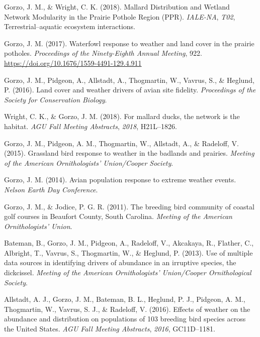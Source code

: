 \documentclass[11pt,a4paper,]{awesome-cv}
\newlength{\cslhangindent}
\newenvironment{CSLReferences}[2] %
 {\begin{list}{}{%
  \setlength{\itemindent}{0pt}
  \setlength{\leftmargin}{0pt}
  \setlength{\parsep}{0pt}
  \ifodd #1
   \setlength{\leftmargin}{\cslhangindent}
   \setlength{\itemindent}{-1\cslhangindent}
  \fi
  \setlength{\itemsep}{#2\baselineskip}}}
 {\end{list}}
\renewcommand{\section}[1]{%
	\vspace{\acvSectionTopSkip}
	\sectionstyle{#1}
	\phantomsection
	\color{gray}\vhrulefill{0.9pt}
}
\begin{document}
\section{Conference Presentations}\label{conference-presentations}

\label{refs-991d93bd90cb12ba09bf79627ab84edc}
\begin{CSLReferences}{1}{0}
Gorzo, J. M., \& Wright, C. K. (2018). Mallard Distribution and Wetland
Network Modularity in the Prairie Pothole Region (PPR). \emph{IALE-NA},
\emph{T02}, Terrestrial--aquatic ecosystem interactions.

Gorzo, J. M. (2017). Waterfowl response to weather and land cover in the
prairie potholes. \emph{Proceedings of the Ninety-Eighth Annual
Meeting}, 922. \url{https://doi.org/10.1676/1559-4491-129.4.911}

Gorzo, J. M., Pidgeon, A., Allstadt, A., Thogmartin, W., Vavrus, S., \&
Heglund, P. (2016). Land cover and weather drivers of avian site
fidelity. \emph{Proceedings of the Society for Conservation Biology}.

Wright, C. K., \& Gorzo, J. M. (2018). For mallard ducks, the network is
the habitat. \emph{AGU Fall Meeting Abstracts}, \emph{2018}, H21L--1826.

Gorzo, J. M., Pidgeon, A. M., Thogmartin, W., Allstadt, A., \& Radeloff,
V. (2015). Grassland bird response to weather in the badlands and
prairies. \emph{Meeting of the American Ornithologists' Union/Cooper
Society}.

Gorzo, J. M. (2014). Avian population response to extreme weather
events. \emph{Nelson Earth Day Conference}.

Gorzo, J. M., \& Jodice, P. G. R. (2011). The breeding bird community of
coastal golf courses in Beaufort County, South Carolina. \emph{Meeting
of the American Ornithologists' Union}.

Bateman, B., Gorzo, J. M., Pidgeon, A., Radeloff, V., Akcakaya, R.,
Flather, C., Albright, T., Vavrus, S., Thogmartin, W., \& Heglund, P.
(2013). Use of multiple data sources in identifying drivers of abundance
in an irruptive species, the dickcissel. \emph{Meeting of the American
Ornithologists' Union/Cooper Ornithological Society}.

Allstadt, A. J., Gorzo, J. M., Bateman, B. L., Heglund, P. J., Pidgeon,
A. M., Thogmartin, W., Vavrus, S. J., \& Radeloff, V. (2016). Effects of
weather on the abundance and distribution on populations of 103 breeding
bird species across the United States. \emph{AGU Fall Meeting
Abstracts}, \emph{2016}, GC11D--1181.

\end{CSLReferences}
\end{document}

